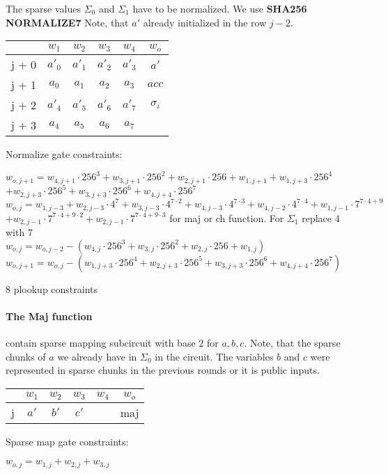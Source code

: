 The sparse values $\Sigma_0$ and $\Sigma_1$ have to be normalized.
We use \textbf{SHA256 NORMALIZE7}
Note, that $a'$ already initialized in the row $j - 2$.
\begin{center}
\begin{tabular}{ c|c|c|c|c|c } 
  & $w_1$ & $w_2$ & $w_3$ & $w_4$ & $w_o$\\ 
 \hline
j + 0 & $a'_0$ & $a'_1$ & $a'_2$ & $a'_3$ &  $a'$\\ 
j + 1 & $a_0$ & $ a_1$ & $a_2$ & $a_3$ & $acc$ \\
j + 2 & $a'_4$ & $a'_5$ & $a'_6$ & $a'_7$ & $\sigma_i$\\ 
j + 3 & $a_4$ & $ a_5$ & $a_6$ & $a_7$ &  \\
\end{tabular}
\end{center}

Normalize gate constraints:
\begin{center}
$w_{o,j+1} = w_{4,j+1} \cdot 256^3 + w_{3,j+1} \cdot 256^2 + w_{2,j+1} \cdot 256
	+ w_{1,j+1} +  w_{1,j+3} \cdot 256^4$ \\ 
	$+ w_{2,j+3} \cdot 256^5+ w_{3,j+3} \cdot 256^6 + w_{4,j+4} \cdot 256^7$ \\
$w_{o,j} = w_{1,j-3} + w_{2,j-3} \cdot 4^7 + w_{3,j-3} \cdot 4^{7 \cdot 2}
	+ w_{4,j-3} \cdot 4^{7 \cdot 3} + w_{4,j-2} \cdot 4^{7 \cdot 4}
	+ w_{1,j-1} \cdot 7^{7 \cdot 4+9}$ \\
	$+ w_{2,j-1} \cdot 7^{7 \cdot 4 + 9 \cdot 2}
	+ w_{2,j-1} \cdot 7^{7 \cdot 4 + 9 \cdot 3}$ for maj or ch function. For $\Sigma_1$ replace 4 with 7\\
$w_{o,j} = w_{o, j - 2} - (w_{4,j} \cdot 256^3 + w_{3,j} \cdot 256^2 + w_{2,j} \cdot 256 + w_{1,j})$ \\
$w_{o,j+1} = w_{o,j} - ( w_{1,j+3} \cdot 256^4 + w_{2,j+3} \cdot 256^5+ w_{3,j+3} \cdot 256^6 + w_{4,j+4} \cdot 256^7)$

8 plookup constraints \\
\end{center}

\paragraph{The Maj function}
contain sparse mapping subcircuit with base $2$ for $a, b ,c$.
Note, that the sparse chunks of $a$ we already have in $\Sigma_0$ in the circuit. 
The variables $b$ and $c$ were represented in sparse chunks in the previous rounds or it is public inputs.
\begin{center}
\begin{tabular}{ c|c|c|c|c|c } 
  & $w_1$ & $w_2$ & $w_3$ & $w_4$ & $w_o$\\ 
 \hline 
j  & $a'$ & $b'$ & $c'$ &  & maj\\ 
\end{tabular}
\end{center}
Sparse map gate constraints:
\begin{center}
$w_{o, j} = w_{1,j} + w_{2, j} + w_{3, j}$ \\
\end{center}


